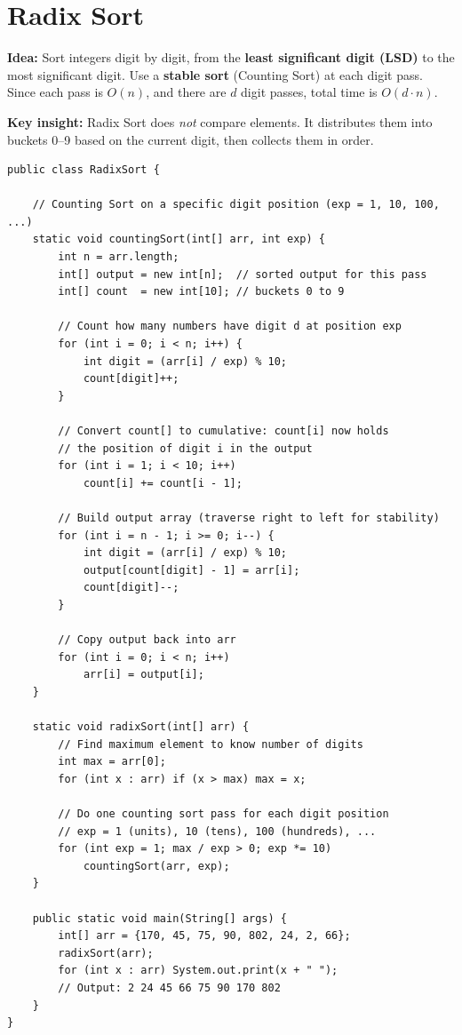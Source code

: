 \documentclass[12pt,a4paper,oneside]{book}
\begin{document}
\section{Radix Sort}

\textbf{Idea:} Sort integers digit by digit, from the \textbf{least significant digit (LSD)} to the most significant digit. Use a \textbf{stable sort} (Counting Sort) at each digit pass. Since each pass is $O(n)$, and there are $d$ digit passes, total time is $O(d \cdot n)$.

\textbf{Key insight:} Radix Sort does \textit{not} compare elements. It distributes them into buckets 0--9 based on the current digit, then collects them in order.

\begin{lstlisting}[caption={Radix Sort --- O(d*n) time, O(n+b) space, stable}]
public class RadixSort {

    // Counting Sort on a specific digit position (exp = 1, 10, 100, ...)
    static void countingSort(int[] arr, int exp) {
        int n = arr.length;
        int[] output = new int[n];  // sorted output for this pass
        int[] count  = new int[10]; // buckets 0 to 9

        // Count how many numbers have digit d at position exp
        for (int i = 0; i < n; i++) {
            int digit = (arr[i] / exp) % 10;
            count[digit]++;
        }

        // Convert count[] to cumulative: count[i] now holds
        // the position of digit i in the output
        for (int i = 1; i < 10; i++)
            count[i] += count[i - 1];

        // Build output array (traverse right to left for stability)
        for (int i = n - 1; i >= 0; i--) {
            int digit = (arr[i] / exp) % 10;
            output[count[digit] - 1] = arr[i];
            count[digit]--;
        }

        // Copy output back into arr
        for (int i = 0; i < n; i++)
            arr[i] = output[i];
    }

    static void radixSort(int[] arr) {
        // Find maximum element to know number of digits
        int max = arr[0];
        for (int x : arr) if (x > max) max = x;

        // Do one counting sort pass for each digit position
        // exp = 1 (units), 10 (tens), 100 (hundreds), ...
        for (int exp = 1; max / exp > 0; exp *= 10)
            countingSort(arr, exp);
    }

    public static void main(String[] args) {
        int[] arr = {170, 45, 75, 90, 802, 24, 2, 66};
        radixSort(arr);
        for (int x : arr) System.out.print(x + " ");
        // Output: 2 24 45 66 75 90 170 802
    }
}
\end{lstlisting}
\end{document}
